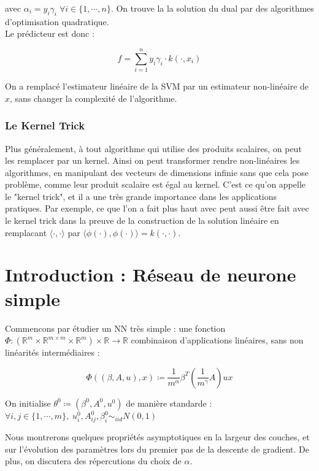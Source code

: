 \documentclass[a4paper, 11pt, french]{article}
\theoremstyle{definition}
\begin{document}
	avec $\alpha_i = y_i \gamma_i \; \forall i \in \{1, \cdots, n\}$. On trouve la la solution du dual par des algorithmes d'optimisation quadratique. \\
	
	Le prédicteur est donc :
	
	\[f = \sum_{i=1}^{n} y_i \gamma_i \cdot k(\cdot, x_i)\]
	
	On a remplacé l'estimateur linéaire de la SVM par un estimateur non-linéaire de $x$, sans changer la complexité de l'algorithme.
	
	\subsubsection{Le Kernel Trick}
	
	Plus généralement, à tout algorithme qui utilise des produits scalaires, on peut les remplacer par un kernel. Ainsi on peut transformer rendre non-linéaires les algorithmes, en manipulant des vecteurs de dimensions infinie sans que cela pose problème, comme leur produit scalaire est égal au kernel. C'est ce qu'on appelle le "kernel trick", et il a une très grande importance dans les applications pratiques. Par exemple, ce que l'on a fait plus haut avec peut aussi être fait avec le kernel trick dans la preuve de la construction de la solution linéaire en remplacant $\langle \cdot, \cdot \rangle$ par $\langle \phi(\cdot), \phi(\cdot) \rangle = k(\cdot, \cdot)$.
	
	\newpage
	
	\section{Introduction : Réseau de neurone simple}
	
	Commencons par étudier un NN très simple : une fonction
	$\Phi : (\mathbb{R}^m \times \mathbb{R}^{m \times m} \times \mathbb{R}^m) \times \mathbb{R} \to \mathbb{R}$ combinaison d'applications linéaires, sans non linéarités  intermédiaires  :
	
	\[ \Phi ((\beta, A, u), x) \coloneqq \frac{1}{m^{\alpha}} \beta^T
		 \left( \frac{1}{m^{\gamma}} A \right) u x \]
		 
	On initialise $\theta^0 \coloneqq (\beta^0, A^0, u^0)$ de manière standarde : 
	$ \forall i,j \in \{1, \cdots, m\} , \; u_i^0, A_{ij}^0, \beta_i^0 \sim_{iid} N(0, 1)$
	
	Nous montrerons quelques propriétés asymptotiques en la largeur des couches, et sur l'évolution des paramètres lors du premier pas de la descente de gradient. De plus, on discutera des répercutions du choix de $\alpha$.
	
\end{document}
